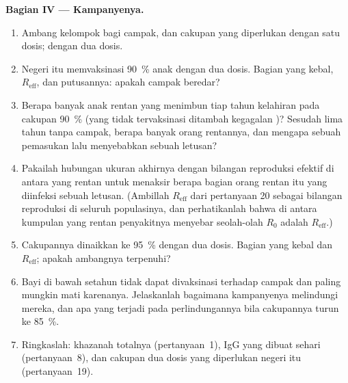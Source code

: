 \begin{problem}
\medskip
\noindent\textbf{Bagian IV --- Kampanyenya.}
\begin{enumerate}[resume]
  \item Ambang kelompok bagi campak, dan cakupan yang diperlukan dengan satu
        dosis; dengan dua dosis.
  \item Negeri itu memvaksinasi \qty{90}{\%} anak dengan dua dosis.
        Bagian yang kebal, $R_{\text{eff}}$, dan putusannya: apakah campak
        beredar?
  \item Berapa banyak anak rentan yang menimbun tiap tahun kelahiran pada
        cakupan \qty{90}{\%} (yang tidak tervaksinasi ditambah kegagalan )? Sesudah
        lima tahun tanpa campak, berapa banyak orang rentannya,
        dan mengapa sebuah pemasukan lalu menyebabkan sebuah letusan?
  \item Pakailah hubungan ukuran akhirnya dengan bilangan reproduksi
        efektif di antara yang rentan untuk menaksir berapa bagian orang
        rentan itu yang diinfeksi sebuah letusan. (Ambillah $R_{\text{eff}}$ dari
        pertanyaan 20 sebagai bilangan reproduksi di seluruh populasinya,
        dan perhatikanlah bahwa di antara kumpulan yang rentan penyakitnya menyebar
        seolah-olah $R_{0}$ adalah $R_{\text{eff}}$.)
  \item Cakupannya dinaikkan ke \qty{95}{\%} dengan dua dosis. Bagian yang
        kebal dan $R_{\text{eff}}$; apakah ambangnya terpenuhi?
  \item Bayi di bawah setahun tidak dapat divaksinasi terhadap campak
        dan paling mungkin mati karenanya. Jelaskanlah bagaimana kampanyenya
        melindungi mereka, dan apa yang terjadi pada perlindungannya bila cakupannya
        turun ke \qty{85}{\%}.
  \item Ringkaslah: khazanah totalnya (pertanyaan~1), IgG yang dibuat  sehari (pertanyaan~8), dan cakupan dua dosis yang
        diperlukan negeri itu (pertanyaan~19).
\end{enumerate}
\end{problem}
